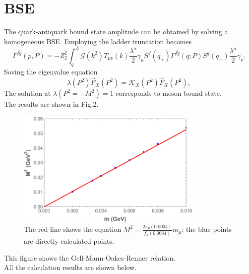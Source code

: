 \documentclass{article}
\begin{document}
\section{BSE}
The quark-antiquark bound state amplitude can be obtained by solving a homogeneous BSE. Employing the ladder truncation becomes
\begin{equation}
    \Gamma^{f\widetilde{g}}\left(p,P\right)=-Z_2^2\int_{q}^{\Lambda}\mathcal{G}\left(k^2\right)T_{\mu\nu}\left(k\right)\frac{\lambda^a}{2}\gamma_{\mu}S^f\left(q_+\right)\Gamma^{f\widetilde{g}}\left(q;P\right)S^g\left(q_-\right)\frac{\lambda^a}{2}\gamma_{\nu}.
\end{equation}
Soving the eigenvalue equation
\begin{equation}
    \lambda\left(P^2\right)\overrightarrow{F}_X\left(P^2\right)=\mathcal{K}_X\left(P^2\right)\overrightarrow{F}_X\left(P^2\right),
\end{equation}
The solution at $\lambda\left(P^2=-M^2\right)=1$ corresponds to meson bound state.\\
The results are shown in Fig.2.
\begin{figure}[H]
    \centering
    \includegraphics[width=0.8\textwidth]{pm-M^2.png}
    \caption{The red line shows the equation $M^2=\frac{2r_P(0.0034)}{f_\pi(0.0034)}m_\mu$; the blue points are directly calculated points.}
\end{figure}
This figure shows the Gell-Mann-Oakes-Renner relation.\\
All the calculation results are shown below.
\end{document}
